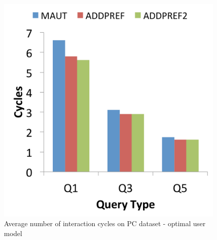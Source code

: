 \begin{figure}[h]
\begin{minipage}{.45\textwidth}
  \includegraphics[width=1\linewidth]{figures-bharath/addPref_pc_opt}
  \caption[]{Average number of interaction cycles on PC dataset - optimal user model}
  \label{fig:addPref_pc_opt}
\end{minipage}
\end{figure}

